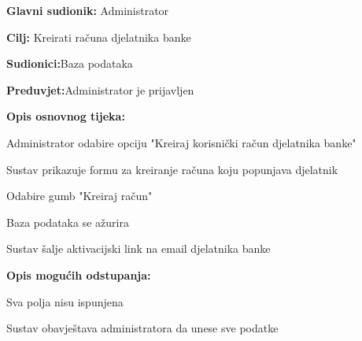 \noindent {}
\begin{packed_item}
	
	\item \textbf{Glavni sudionik: }{Administrator}
	\item  \textbf{Cilj:} {Kreirati računa djelatnika banke}
	\item  \textbf{Sudionici:}{Baza podataka}
	\item  \textbf{Preduvjet:}{Administrator je prijavljen}
	\item  \textbf{Opis osnovnog tijeka:}
	
	\item[] \begin{packed_enum}
		
		\item {Administrator odabire opciju "Kreiraj korisnički račun djelatnika banke"}
		\item {Sustav prikazuje formu za kreiranje računa koju popunjava djelatnik} 
		\item {Odabire gumb "Kreiraj račun"}
		\item {Baza podataka se ažurira}
		\item {Sustav šalje aktivacijski link na email djelatnika banke}
	\end{packed_enum}
	
	\item  \textbf{Opis mogućih odstupanja:}
	
	\item[] \begin{packed_item}
		
		\item[2.a]{Sva polja nisu ispunjena}
		\item[] \begin{packed_enum}
			
			\item Sustav obavještava administratora da unese sve podatke
			
		\end{packed_enum}
	\end{packed_item}
\end{packed_item}
\eject 
\noindent {}
